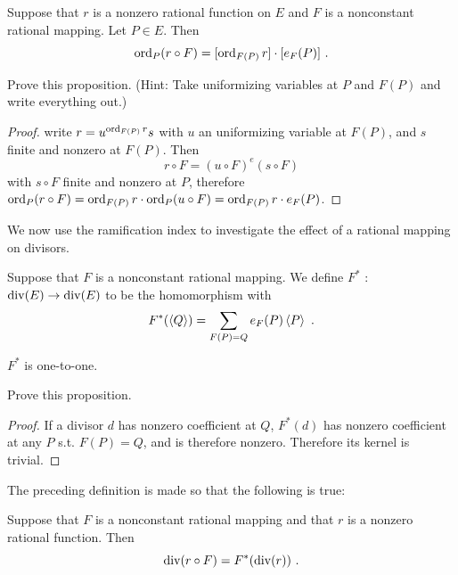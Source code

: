 \begin{prop}
\label{p11.4}
Suppose that $r$ is a nonzero rational function on $E$ and $F$ is a nonconstant rational mapping. Let $P\in E$. Then
$$
\operatorname{ord}_{P}(r\circ F)=[\operatorname{ord}_{F(P)}r]\cdot[e_{F}(P)]\ .
$$
\end{prop}

\begin{exo}
\label{l11.5}
Prove this proposition. (Hint: Take uniformizing variables at $P$ and $F(P)$ and write everything out.)
\end{exo}

\begin{proof} 
write $r=u^{\operatorname{ord}_{F(P)}r} s$ with $u$ an uniformizing variable at $F(P)$, and $s$ finite and nonzero at $F(P)$. Then $$r\circ F=(u\circ F)^e (s\circ F)$$ with $s\circ F$ finite and nonzero at $P$, therefore $\operatorname{ord}_{P}(r\circ F) = \operatorname{ord}_{F(P)}r \cdot \operatorname{ord}_{P}(u \circ F) = \operatorname{ord}_{F(P)}r \cdot e_F(P)$.
\end{proof}

We now use the ramification index to investigate the effect of a rational mapping on divisors.

\begin{defi}
\label{d11.6}
Suppose that $F$ is a nonconstant rational mapping. We define $F^{*}$ : $\operatorname{div}(E)\rightarrow \operatorname{div}(E)$ to be the homomorphism with
$$
 F^{*}(\divisor{Q})=\sum_{F(P)=Q}e_{F}(P)\divisor{P}\ .
$$
\end{defi}

\begin{prop}
\label{p11.7}
$F^{*}$ is one-to-one.
\end{prop}

\begin{exo}
\label{l11.8}
Prove this proposition.
\end{exo}

\begin{proof}
If a divisor $d$ has nonzero coefficient at $Q$, $F^*(d)$ has nonzero coefficient at any $P$ s.t. $F(P)=Q$, and is therefore nonzero. Therefore its kernel is trivial.
\end{proof}

The preceding definition is made so that the following is true:

\begin{prop}
\label{p11.9}
Suppose that $F$ is a nonconstant rational mapping and that $r$ is a nonzero rational function. Then
$$
\on{div}(r\circ F)=F^{*}(\on{div}(r))\ .
$$
\end{prop}

